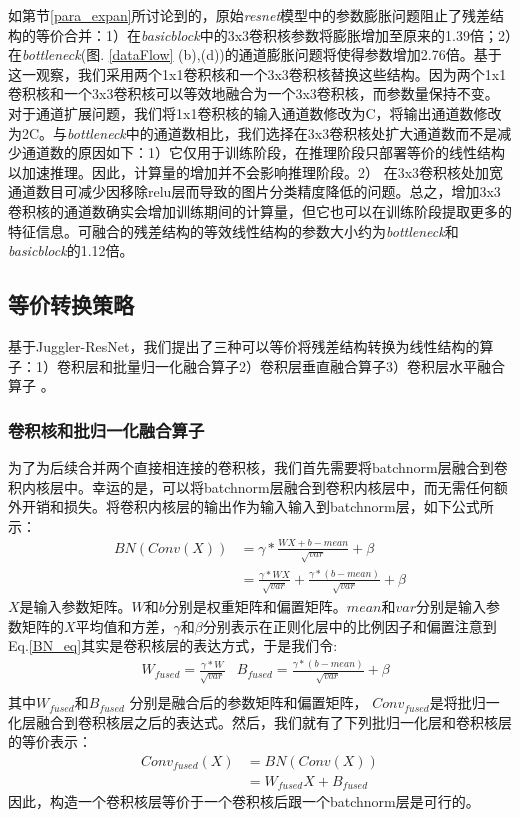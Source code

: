 如第节\ref{para_expan}所讨论到的，原始\emph{resnet}模型中的参数膨胀问题阻止了残差结构的等价合并：1）在\emph{basicblock}中的3x3卷积核参数将膨胀增加至原来的1.39倍；2）在\emph{bottleneck}(图. \ref{dataFlow} (b),(d))的通道膨胀问题将使得参数增加2.76倍。基于这一观察，我们采用两个1x1卷积核和一个3x3卷积核替换这些结构。因为两个1x1卷积核和一个3x3卷积核可以等效地融合为一个3x3卷积核，而参数量保持不变。对于通道扩展问题，我们将1x1卷积核的输入通道数修改为C，将输出通道数修改为2C。与\emph{bottleneck}中的通道数相比，我们选择在3x3卷积核处扩大通道数而不是减少通道数的原因如下：1）它仅用于训练阶段，在推理阶段只部署等价的线性结构以加速推理。因此，计算量的增加并不会影响推理阶段。2） 在3x3卷积核处加宽通道数目可减少因移除relu层而导致的图片分类精度降低的问题。总之，增加3x3卷积核的通道数确实会增加训练期间的计算量，但它也可以在训练阶段提取更多的特征信息。可融合的残差结构的等效线性结构的参数大小约为\emph{bottleneck}和\emph{basicblock}的1.12倍。


\subsection{等价转换策略}
基于Juggler-ResNet，我们提出了三种可以等价将残差结构转换为线性结构的算子：1）卷积层和批量归一化融合算子2）卷积层垂直融合算子3）卷积层水平融合算子
。
\subsubsection{卷积核和批归一化融合算子}
\label{sub1}
为了为后续合并两个直接相连接的卷积核，我们首先需要将batchnorm层融合到卷积内核层中。幸运的是，可以将batchnorm层融合到卷积内核层中，而无需任何额外开销和损失。将卷积内核层的输出作为输入输入到batchnorm层，如下公式所示：
\begin{equation}
\begin{aligned}
\label{BN_eq}
BN(Conv(X)) &= \gamma * \frac{WX + b - mean}{\sqrt{var}} + \beta \\
&= \frac{\gamma * WX}{\sqrt{var}} + \frac{\gamma * (b - mean)}{\sqrt{var}} + \beta
\end{aligned}
\end{equation}
$X$是输入参数矩阵。$W$和$b$分别是权重矩阵和偏置矩阵。$mean$和$var$分别是输入参数矩阵的$X$平均值和方差，$\gamma$和$\beta$分别表示在正则化层中的比例因子和偏置注意到Eq.\ref{BN_eq}其实是卷积核层的表达方式，于是我们令:
\begin{equation}
\begin{aligned}
&W_{fused} = \frac{\gamma * W}{\sqrt{var}} &B_{fused} = \frac{\gamma * (b - mean)}{\sqrt{var}} + \beta \\
\end{aligned}
\end{equation}
其中$W_{fused}$和$B_{fused}$ 分别是融合后的参数矩阵和偏置矩阵， $Conv_{fused}$是将批归一化层融合到卷积核层之后的表达式。然后，我们就有了下列批归一化层和卷积核层的等价表示：
\begin{equation}
\begin{aligned}
Conv_{fused}(X) &= BN(Conv(X)) \\
&= W_{fused}X + B_{fused}
\end{aligned}
\end{equation}
因此，构造一个卷积核层等价于一个卷积核后跟一个batchnorm层是可行的。



